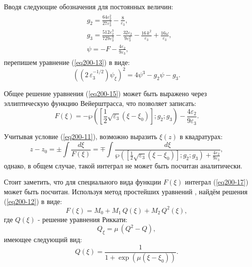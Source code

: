 \documentclass[14pt,a4paper]{extreport}
\begin{document}
			Вводя следующие обозначения для постоянных величин:
			\begin{equation} \label{eq200-14}
				\begin{aligned}
					\begin{split}
					&g_{2}=\frac{64 \varepsilon_{2}^{2}}{27 \varepsilon_{3}^{2}}-\frac{8 }{\varepsilon_{3}},\\
					&g_{3}=\frac{512 \varepsilon_{2}^{3}}{729 \varepsilon_{3}^{3}}
					-\frac{32 \varepsilon_{2}}{9 \varepsilon_{3}^{2}}
					-\frac{16 \,k^{2}}{\varepsilon_{3}}
					+\frac{16 \omega}{\varepsilon_{3}},\\
					&\psi=-F-\frac{4 \varepsilon_{2}}{9 \varepsilon_{3}},
					\end{split}
				\end{aligned}
			\end{equation}
			перепишем уравнение (\ref{eq200-13}) в виде:
			\begin{equation}\label{eq200-15}
				\left(\left(2\,\varepsilon_{3}^{-1/2}\right)\psi_{\xi}\right)^{2}=4 \psi^{3}-g_{2} \psi-g_{3}.
			\end{equation}

			Общее решение уравнения (\ref{eq200-15}) может быть выражено через эллиптическую функцию Вейерштрасса, что позволяет записать:
			\begin{equation}\label{eq200-16}
				F(\xi)=-\wp\left(\left[\frac{1}{2}\sqrt{\varepsilon_{3}}\left(\xi-\xi_{0}\right)\right];g_{2};g_{3}\right)-\frac{4 \varepsilon_{2}}{9 \varepsilon_{3}}.
			\end{equation}

			Учитывая условие (\ref{eq200-11}), возможно выразить \(\xi(z)\) в квадратурах: 
			\begin{equation}\label{eq200-17}
				z-z_{0}=\pm\int \frac{d\xi}{F(\xi)}=\mp \int \frac{d\xi}{\wp\left(\left[\frac{1}{2}\sqrt{\varepsilon_{3}}\left(\xi-\xi_{0}\right)\right];g_{2};g_{3}\right) + \frac{4 \varepsilon_{2}}{9 \varepsilon_{3}} },
			\end{equation}
			однако, в общем случае, такой интеграл не может быть посчитан аналитически. 

			Стоит заметить, что для специального вида функции \(F(\xi)\) интеграл (\ref{eq200-17}) может быть посчитан.
			Используя метод простейших уравнений \cite{Rad4}, найдём решения (\ref{eq200-12}) в виде:
			\begin{equation} \label{eq15}
				F(\xi)=M_{0}+M_{1}\,Q(\xi)+M_{2}\,Q^{2}(\xi),
			\end{equation}
			где \(Q(\xi)\) - решение уравнения Риккати:
			\begin{equation}\label{eq16}
				Q_{\xi}=\mu\,(Q^{2}-Q),
			\end{equation}
			имеющее следующий вид:
			\begin{equation}
				Q(\xi)=\frac{1}{1+\exp\left(\mu(\xi-\xi_{0})\right)}.
			\end{equation}
\end{document}
